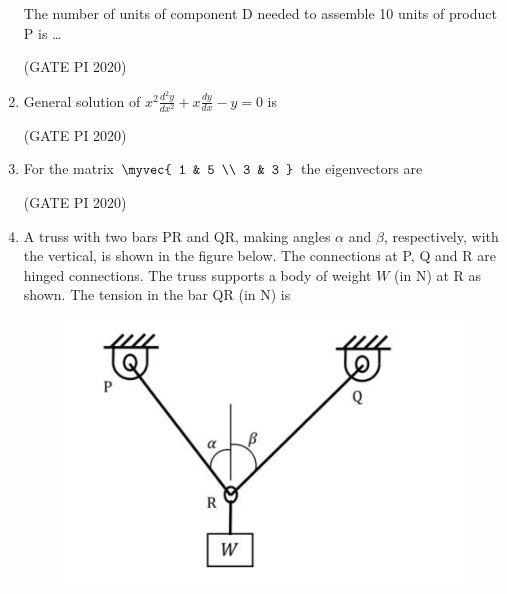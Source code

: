 \documentclass[journal,12pt,onecolumn]{IEEEtran}
\theoremstyle{remark}
\begin{document}
\begin{enumerate}
The number of units of component D needed to assemble 10 units of product P is \dots

\hfill (GATE PI 2020)

\item General solution of $x^2 \frac{d^2 y}{dx^2} + x \frac{dy}{dx} - y = 0$ is
\begin{enumerate}
\end{enumerate}

\hfill (GATE PI 2020)

\item For the matrix
$
\myvec{
1 & 5 \\
3 & 3
}
$
the eigenvectors are
\begin{enumerate}
\end{enumerate}

\hfill (GATE PI 2020)

\item A truss with two bars PR and QR, making angles $\alpha$ and $\beta$, respectively, with the vertical, is shown in the figure below. The connections at P, Q and R are hinged connections. The truss supports a body of weight $W$ (in N) at R as shown. The tension in the bar QR (in N) is

\begin{figure}[H]
    \centering
    \includegraphics[width=0.5\columnwidth]{figs/fig11.png}
    \caption{}
    \label{fig:placeholder}
\end{figure}


\end{enumerate}
\end{document}
